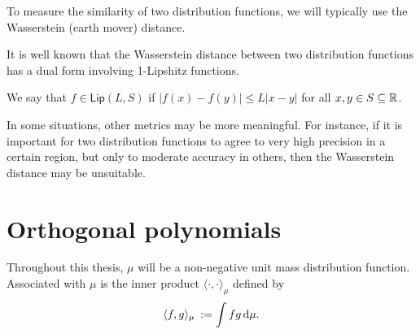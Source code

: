 To measure the similarity of two distribution functions, we will typically use the Wasserstein (earth mover) distance.

It is well known that the Wasserstein distance between two distribution functions has a dual form involving 1-Lipshitz functions. 
\begin{definition}
    We say that \( f\in \mathsf{Lip}(L,S) \) if \( |f(x) - f(y)| \leq L|x-y| \) for all \( x,y \in S \subseteq \mathbb{R} \).
\end{definition}

\begin{remark}
    In some situations, other metrics may be more meaningful. 
    For instance, if it is important for two distribution functions to agree to very high precision in a certain region, but only to moderate accuracy in others, then the Wasserstein distance may be unsuitable.
\end{remark}


\section{Orthogonal polynomials}
\label{sec:OP}


Throughout this thesis, \( \mu \) will be a non-negative unit mass distribution function. 
Associated with \( \mu \) is the inner product \( \langle \cdot, \cdot \rangle_\mu \) defined by
\label{def:mu}
\begin{equation}
    \label{eqn:mu_ip}
    \langle f, g\rangle_\mu\: := \int fg \,\textup{d}\mu.
\end{equation}

